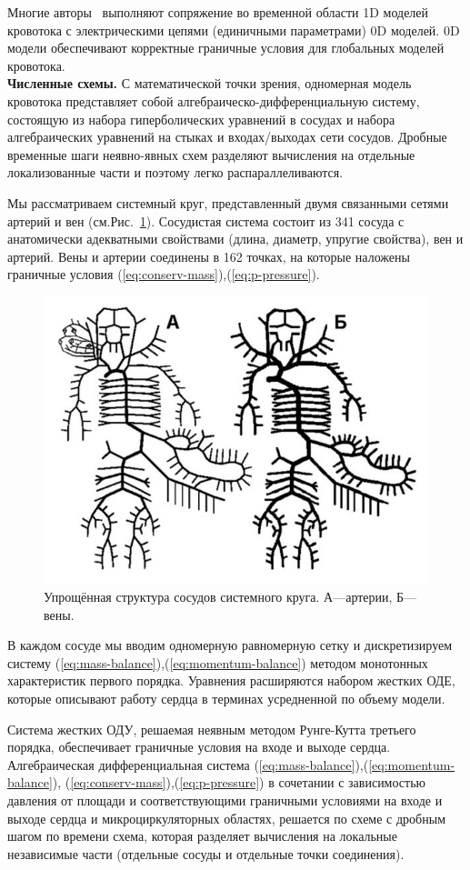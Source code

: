 Многие авторы~\cite{alastruey:2008} выполняют сопряжение во временной области 1D моделей кровотока с электрическими цепями 
(единичными параметрами) 0D моделей. 0D модели обеспечивают корректные граничные условия для глобальных моделей кровотока.
\\

{\bf Численные схемы.}
С математической точки зрения, одномерная модель кровотока представляет собой алгебраическо-дифференциальную систему, 
состоящую из набора гиперболических уравнений в сосудах и набора алгебраических уравнений на стыках и входах/выходах сети сосудов. 
Дробные временные шаги неявно-явных схем разделяют вычисления на отдельные локализованные части и поэтому легко распараллеливаются.

Мы рассматриваем системный круг, представленный двумя связанными сетями артерий и вен (см.Рис.~\ref{ss}). 
Сосудистая система состоит из 341 сосуда с анатомически адекватными свойствами (длина, диаметр, упругие свойства), вен и артерий. 
Вены и артерии соединены в 162 точках, на которые наложены граничные условия (\ref{eq:conserv-mass}),(\ref{eq:p-pressure}). 

\begin{figure}[h]
\centering
\includegraphics[width=0.5\linewidth]{krug.png}
\caption{Упрощённая структура сосудов системного круга. А—артерии, Б—вены.}
\label{ss}
\end{figure}

В каждом сосуде мы вводим одномерную равномерную сетку и дискретизируем систему (\ref{eq:mass-balance}),(\ref{eq:momentum-balance}) 
методом монотонных характеристик первого порядка. Уравнения расширяются набором жестких ОДЕ, которые описывают работу сердца в терминах 
усредненной по объему модели.

Система жестких ОДУ, решаемая неявным методом Рунге-Кутта третьего порядка, обеспечивает граничные условия на входе и выходе сердца. 
Алгебраическая дифференциальная система (\ref{eq:mass-balance}),(\ref{eq:momentum-balance}), (\ref{eq:conserv-mass}),(\ref{eq:p-pressure}) 
в сочетании с зависимостью давления от площади и соответствующими граничными условиями на входе и выходе сердца 
и микроциркуляторных областях, решается по схеме с дробным шагом по времени схема, которая разделяет вычисления на 
локальные независимые части (отдельные сосуды и отдельные точки соединения).

